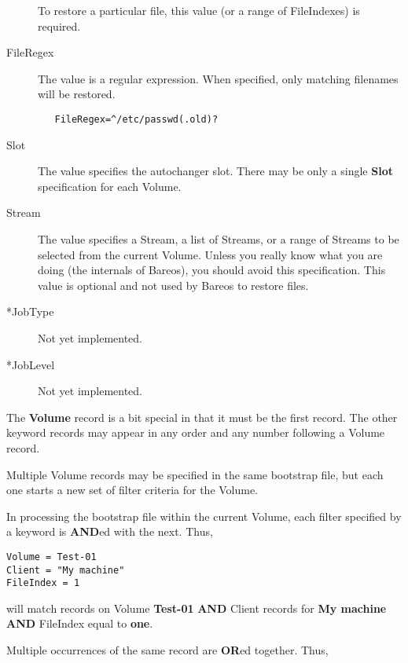 \begin{description}
   To restore a particular file, this value (or a range of FileIndexes) is
   required.

\item [FileRegex]
   The value is a regular expression.  When specified, only matching
   filenames will be restored.

\begin{verbatim}
   FileRegex=^/etc/passwd(.old)?
\end{verbatim}

\item [Slot]
   The value specifies the autochanger slot. There may  be only a single {\bf
   Slot} specification for each Volume.

\item [Stream]
   The value specifies a Stream, a list of Streams,  or a range of Streams to be
   selected from the current Volume.  Unless you really know what you are doing
   (the internals of  Bareos), you should avoid this specification.
   This value is optional and not used by Bareos to restore files.

\item [*JobType]
   Not yet implemented.

\item [*JobLevel]
   Not yet implemented.
\end{description}

The {\bf Volume} record is a bit special in that it must be the first record.
The other keyword records may appear in any order and any number following a
Volume record.

Multiple Volume records may be specified in the same bootstrap file, but each
one starts a new set of filter criteria for the Volume.

In processing the bootstrap file within the current Volume, each filter
specified by a keyword is {\bf AND}ed with the next. Thus,

\footnotesize
\begin{verbatim}
Volume = Test-01
Client = "My machine"
FileIndex = 1
\end{verbatim}
\normalsize

will match records on Volume {\bf Test-01} {\bf AND} Client records for {\bf
My machine} {\bf AND} FileIndex equal to {\bf one}.

Multiple occurrences of the same record are {\bf OR}ed together. Thus,

